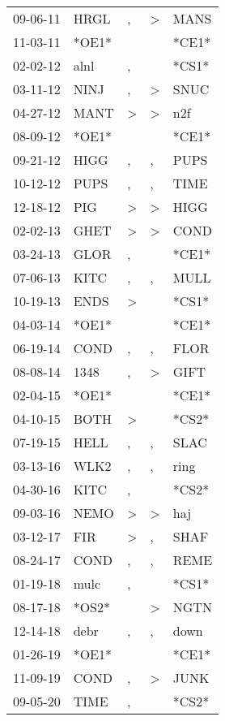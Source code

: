 \begin{supertabular}{lllll}
 09-06-11 &   HRGL &                , &     \textgreater &   MANS \\
 11-03-11 &  *OE1* &                  &                  &  *CE1* \\
 02-02-12 &   alnl &                , &                  &  *CS1* \\
 03-11-12 &   NINJ &                , &     \textgreater &   SNUC \\
 04-27-12 &   MANT &     \textgreater &     \textgreater &    n2f \\
 08-09-12 &  *OE1* &                  &                  &  *CE1* \\
 09-21-12 &   HIGG &                , &                , &   PUPS \\
 10-12-12 &   PUPS &                , &                , &   TIME \\
 12-18-12 &    PIG &     \textgreater &     \textgreater &   HIGG \\
 02-02-13 &   GHET &     \textgreater &     \textgreater &   COND \\
 03-24-13 &   GLOR &                , &                  &  *CE1* \\
 07-06-13 &   KITC &                , &                , &   MULL \\
 10-19-13 &   ENDS &     \textgreater &                  &  *CS1* \\
 04-03-14 &  *OE1* &                  &                  &  *CE1* \\
 06-19-14 &   COND &                , &                , &   FLOR \\
 08-08-14 &   1348 &                , &     \textgreater &   GIFT \\
 02-04-15 &  *OE1* &                  &                  &  *CE1* \\
 04-10-15 &   BOTH &     \textgreater &                  &  *CS2* \\
 07-19-15 &   HELL &                , &                , &   SLAC \\
 03-13-16 &   WLK2 &                , &                , &   ring \\
 04-30-16 &   KITC &                , &                  &  *CS2* \\
 09-03-16 &   NEMO &     \textgreater &     \textgreater &    haj \\
 03-12-17 &    FIR &     \textgreater &                , &   SHAF \\
 08-24-17 &   COND &                , &                , &   REME \\
 01-19-18 &   mulc &                , &                  &  *CS1* \\
 08-17-18 &  *OS2* &                  &     \textgreater &   NGTN \\
 12-14-18 &   debr &                , &                , &   down \\
 01-26-19 &  *OE1* &                  &                  &  *CE1* \\
 11-09-19 &   COND &                , &     \textgreater &   JUNK \\
 09-05-20 &   TIME &                , &                  &  *CS2* \\
\end{supertabular}
